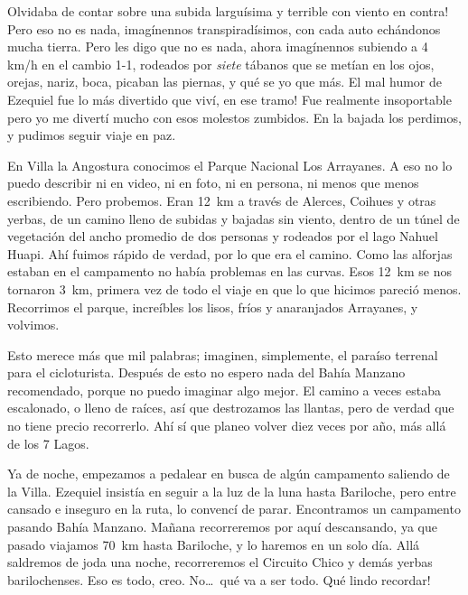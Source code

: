 \textexclamdown Olvidaba de contar sobre una subida largu\'isima y terrible con
viento en contra! Pero eso no es nada, imag\'inennos transpirad\'isimos, con
cada auto ech\'andonos mucha tierra. Pero les digo que no es nada, ahora
imag\'inennos subiendo a 4 km/h en el cambio 1-1, rodeados por \emph{siete}
t\'abanos que se met\'ian en los ojos, orejas, nariz, boca, picaban las piernas,
y qu\'e se yo que m\'as. \textexclamdown El mal humor de Ezequiel fue lo m\'as
divertido que viv\'i, en ese tramo! Fue realmente insoportable pero yo me
divert\'i mucho con esos molestos zumbidos. En la bajada los perdimos, y pudimos
seguir viaje en paz.

En Villa la Angostura conocimos el Parque Nacional Los Arrayanes. A eso no lo
puedo describir ni en video, ni en foto, ni en persona, ni menos que menos
escribiendo. Pero probemos. Eran 12~km a trav\'es de Alerces, Coihues y otras
yerbas, de un camino lleno de subidas y bajadas sin viento, dentro de un t\'unel
de vegetaci\'on del ancho promedio de dos personas y rodeados por el lago Nahuel
Huapi. Ah\'i fuimos r\'apido de verdad, por lo que era el camino. Como las
alforjas estaban en el campamento no hab\'ia problemas en las curvas. Esos 12~km
se nos tornaron 3~km, primera vez de todo el viaje en que lo que hicimos
pareci\'o menos. Recorrimos el parque, incre\'ibles los lisos, fr\'ios y
anaranjados Arrayanes, y volvimos.

Esto merece m\'as que mil palabras; imaginen, simplemente, el para\'iso terrenal
para el cicloturista. Despu\'es de esto no espero nada del Bah\'ia Manzano
recomendado, porque no puedo imaginar algo mejor. El camino a veces estaba
escalonado, o lleno de ra\'ices, as\'i que destrozamos las llantas, pero
de verdad que no tiene precio recorrerlo. Ah\'i s\'i que planeo volver diez
veces por a\~no, m\'as all\'a de los 7 Lagos.

Ya de noche, empezamos a pedalear en busca de alg\'un campamento saliendo de la
Villa. Ezequiel insist\'ia en seguir a la luz de la luna hasta Bariloche, pero
entre cansado e inseguro en la ruta, lo convenc\'i de parar. Encontramos un
campamento pasando Bah\'ia Manzano. Ma\~nana recorreremos por aqu\'i
descansando, ya que pasado viajamos 70~km hasta Bariloche, y lo haremos en un
solo d\'ia. All\'a saldremos de joda una noche, recorreremos el Circuito Chico y
dem\'as yerbas barilochenses. Eso es todo, creo. No\ldots\ qu\'e va a ser todo.
\textexclamdown Qu\'e lindo recordar!

